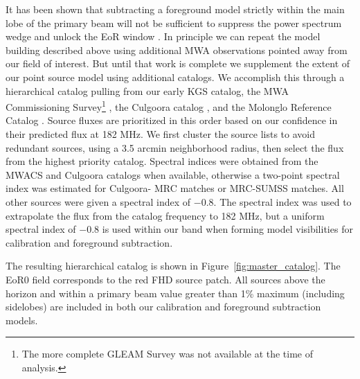 \documentclass[iop]{emulateapj}
\begin{document}
It has been shown that subtracting a foreground model strictly within the main lobe of the 
primary beam will not be sufficient to suppress the power spectrum wedge and unlock the 
EoR window \citep{Pober:2016, Thyagarajan:2015, Thyagarajan:2015b}. In principle we 
can repeat the model building described above using additional MWA observations pointed 
away from our field of interest. But until that work is complete we supplement the extent of 
our point source model using additional catalogs. We accomplish this through a hierarchical 
catalog pulling from our early KGS catalog, the MWA Commissioning Survey\footnote{The 
more complete GLEAM Survey \citep[][Hurley-Walker et al., in collaboration review]
{Wayth:2015} was not available at the time of analysis.} \citep[MWACS, ][]
{Hurley-Walker:2014}, the Culgoora catalog \citep{Slee:1977}, and the Molonglo Reference Catalog 
\citep[MRC, ][]{Large:1981}. Source fluxes are prioritized in this order based on our 
confidence in their predicted flux at 182 MHz. We first cluster the source lists to avoid 
redundant sources, using a 3.5 arcmin neighborhood radius, then select the flux from the 
highest priority catalog. Spectral indices were obtained from the MWACS and Culgoora 
catalogs when available, otherwise a two-point spectral index was estimated for Culgoora-
MRC matches or MRC-SUMSS matches. All other sources were given a spectral index of 
$-0.8$. The spectral index was used to extrapolate the flux from the catalog frequency to 
182 MHz, but a uniform spectral index of $-0.8$ is used within our band when forming 
model visibilities for calibration and foreground subtraction.

The resulting hierarchical catalog is shown in Figure~\ref{fig:master_catalog}. The EoR0 
field corresponds to the red FHD source patch. All sources above the horizon and within a 
primary beam value greater than 1\% maximum (including sidelobes) are included in both 
our calibration and foreground subtraction models.  
\end{document}
